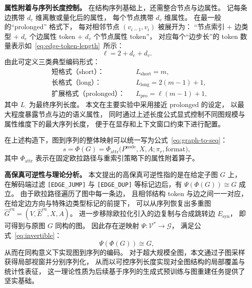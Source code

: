 \textbf{属性附着与序列长度控制。}
在结构序列基础上，还需整合节点与边属性。
记每条边携带 \(d_e\) 维离散或量化后的属性，
每个节点携带 \(d_v\) 维属性。
在最一般的“prolonged” 格式下，
每对相邻节点 \((v_{i-1}, v_i)\) 被展开为：
“节点索引 + 边类型 + $d_e$ 个边属性 token + $d_v$ 个节点属性 token”，
对应每个“边步长”的 token 数量表示如~\ref{eq:edge-token-length}\ 所示：
\begin{equation}
    \ell = 2 + d_e + d_v.
    \label{eq:edge-token-length}
\end{equation}
由此可定义三类典型编码形式：
\begin{align}
    &\text{短格式（short）：} 
    &&L_{\mathrm{short}} = m, \\
    &\text{长格式（long）：} 
    &&L_{\mathrm{long}} = 2(m-1) + 1, \\
    &\text{扩展格式（prolonged）：} 
    &&L_{\mathrm{pro}} = \ell (m-1) + 1,
\end{align}
其中 \(L_{\cdot}\) 为最终序列长度。
本文在主要实验中采用接近 prolonged 的设定，
以最大程度暴露节点与边的语义属性，
同时通过上述长度公式显式控制不同图规模与属性维度下的最大序列长度，
便于在显存和上下文窗口约束下进行配置。

在上述构造下，图到序列的整体映射可以统一写为公式~\ref{eq:graph-to-seq}：
\begin{equation}
    s = \Phi(G) = 
    \Phi_{\mathrm{attr}}\!\big(P^{\mathrm{node}}, X, A; \pi_r, \text{format}\big),
    \label{eq:graph-to-seq}
\end{equation}
其中 \(\Phi_{\mathrm{attr}}\) 表示在固定欧拉路径与重索引策略下的属性附着算子。

\textbf{高保真可逆性与理论分析。}
本文提出的高保真可逆性指的是在给定子图 $G$ 上，
在解码端过滤 \texttt{[EDGE\_JUMP]} 与 \texttt{[EDGE\_DUP]} 等标记边后，有 $\Psi(\Phi(G))\cong G$ 成立。
由于欧拉路径遍历了图中每一条边，
且相邻结构 token 与边之间一一对应，
在给定边方向与特殊边类型标记的前提下，
可以从序列恢复出多重图
\(
\hat{G}^{\mathrm{eu}} = (V, \hat{E}^{\mathrm{eu}}, X, A)
\)。
进一步移除欧拉化引入的边复制与合成跳转边 \(E_{\mathrm{syn}}\)，
即可得到与原图 \(G\) 同构的图。
因此存在逆映射
\(
\Psi: \mathcal{V}^\ast \rightarrow \mathcal{G}
\)，
满足公式~\ref{eq:invertible}：
\begin{equation}
    \Psi(\Phi(G)) \cong G,
    \label{eq:invertible}
\end{equation}
从而在同构意义下实现图到序列的编码。
对于超大规模全图，本文通过子图采样获得局部视窗并分别序列化，
从而以可控序列长度实现对全图结构的{局部覆盖与统计性表征}，
这一理论性质为后续基于序列的生成式预训练与图重建任务提供了坚实基础。

